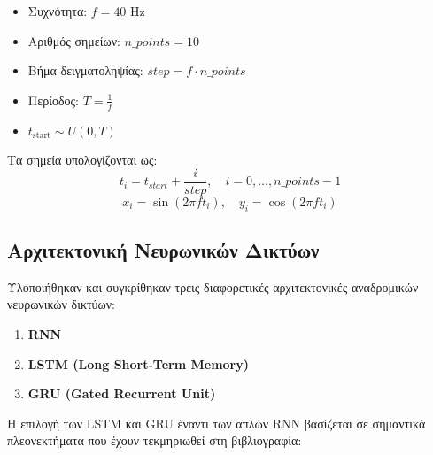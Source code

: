 \documentclass[a4paper,12pt]{article}
\begin{document}
\begin{itemize}
    \item Συχνότητα: $f = 40$ Hz
    \item Αριθμός σημείων: $n\_points = 10$
    \item Βήμα δειγματοληψίας: $step = f \cdot n\_points$
    \item Περίοδος: $T = \frac{1}{f}$
    \item $t_{\text{start}} \sim U(0,T)$
\end{itemize}

Τα σημεία υπολογίζονται ως:
\begin{equation}
    t_i = t_{start} + \frac{i}{step}, \quad i = 0,\ldots,n\_points-1
\end{equation}
\begin{equation}
    x_i = \sin(2\pi f t_i), \quad y_i = \cos(2\pi f t_i)
\end{equation}

\subsection*{Αρχιτεκτονική Νευρωνικών Δικτύων}

Υλοποιήθηκαν και συγκρίθηκαν τρεις διαφορετικές αρχιτεκτονικές αναδρομικών νευρωνικών δικτύων:

\begin{enumerate}
    \item \textbf{RNN}
    \item \textbf{LSTM (Long Short-Term Memory)}
    \item \textbf{GRU (Gated Recurrent Unit)}
\end{enumerate}

Η επιλογή των LSTM και GRU έναντι των απλών RNN βασίζεται σε σημαντικά πλεονεκτήματα που έχουν τεκμηριωθεί στη βιβλιογραφία:
\end{document}

